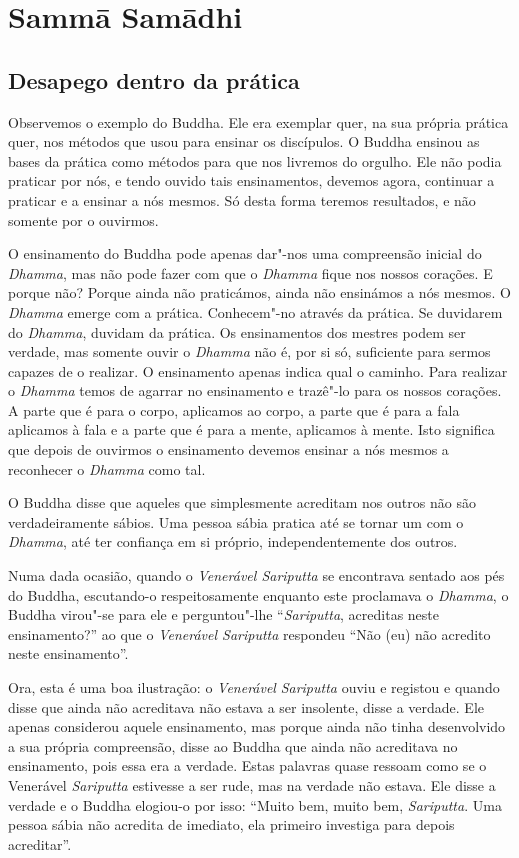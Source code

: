 \chapter{Sammā Samādhi}

\section{Desapego dentro da prática}

Observemos o exemplo do Buddha. Ele era exemplar quer, na sua própria
prática quer, nos métodos que usou para ensinar os discípulos. O Buddha
ensinou as bases da prática como métodos para que nos livremos do
orgulho. Ele não podia praticar por nós, e tendo ouvido tais
ensinamentos, devemos agora, continuar a praticar e a ensinar a nós
mesmos. Só desta forma teremos resultados, e não somente por o ouvirmos.

O ensinamento do Buddha pode apenas dar"-nos uma compreensão inicial do
\emph{Dhamma}, mas não pode fazer com que o \emph{Dhamma} fique nos
nossos corações. E porque não? Porque ainda não praticámos, ainda não
ensinámos a nós mesmos. O \emph{Dhamma} emerge com a prática.
Conhecem"-no através da prática. Se duvidarem do \emph{Dhamma}, duvidam
da prática. Os ensinamentos dos mestres podem ser verdade, mas somente
ouvir o \emph{Dhamma} não é, por si só, suficiente para sermos capazes
de o realizar. O ensinamento apenas indica qual o caminho. Para realizar
o \emph{Dhamma} temos de agarrar no ensinamento e trazê"-lo para os
nossos corações. A parte que é para o corpo, aplicamos ao corpo, a parte
que é para a fala aplicamos à fala e a parte que é para a mente,
aplicamos à mente. Isto significa que depois de ouvirmos o ensinamento
devemos ensinar a nós mesmos a reconhecer o \emph{Dhamma} como
tal.

O Buddha disse que aqueles que simplesmente acreditam nos outros não são
verdadeiramente sábios. Uma pessoa sábia pratica até se tornar um com o
\emph{Dhamma}, até ter confiança em si próprio, independentemente dos
outros.

Numa dada ocasião, quando o \emph{Venerável Sariputta} se encontrava sentado aos
pés do Buddha, escutando-o respeitosamente enquanto este proclamava o
\emph{Dhamma}, o Buddha virou"-se para ele e perguntou"-lhe ``\emph{Sariputta},
acreditas neste ensinamento?'' ao que o \emph{Venerável Sariputta} respondeu
``Não (eu) não acredito neste ensinamento''.

Ora, esta é uma boa ilustração: o \emph{Venerável} \emph{Sariputta}
ouviu e registou e quando disse que ainda não acreditava não estava a
ser insolente, disse a verdade. Ele apenas considerou aquele
ensinamento, mas porque ainda não tinha desenvolvido a sua própria
compreensão, disse ao Buddha que ainda não acreditava no ensinamento,
pois essa era a verdade. Estas palavras quase ressoam como se o
Venerável \emph{Sariputta} estivesse a ser rude, mas na verdade não
estava. Ele disse a verdade e o Buddha elogiou-o por isso: ``Muito bem,
muito bem, \emph{Sariputta}. Uma pessoa sábia não acredita de imediato,
ela primeiro investiga para depois acreditar''.


